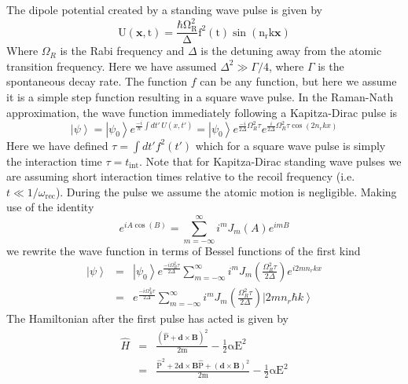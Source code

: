The dipole potential created by a standing wave pulse is given by
\begin{equation}
\mathrm{U(\mathbf{x},t)=\frac{\hbar \Omega_R^2}{\Delta}f^2(t)\sin{(n_rk\mathbf{x})}}
\end{equation}
Where $\Omega_R$ is the Rabi frequency and $\Delta$ is the detuning away from the atomic transition frequency.  Here we have assumed $\Delta^2 \gg \Gamma/4$, where $\Gamma$ is the spontaneous decay rate. The function $f$ can be any function, but here we assume it is a simple step function resulting in a square wave pulse.
In the Raman-Nath approximation, the wave function immediately following a Kapitza-Dirac pulse is \cite{meystre,ketterle}
\begin{equation}
\left|\psi\right>=\left|\psi_0\right>e^{\frac{-i}{\hbar}\int dt'\,U(x,t')}=\left|\psi_0\right>e^{\frac{-i}{2\Delta}\Omega_R^2\tau}e^{\frac{i}{2\Delta}\Omega_R^2\tau\cos{(2n_rkx)}}
\end{equation}
Here we have defined $\tau=\int dt' f^2(t')$ which for a square wave pulse is simply the interaction time $\tau=t_{\mathrm{int}}$.  Note that for Kapitza-Dirac standing wave pulses we are assuming short interaction times relative to the recoil frequency (i.e.\, $t\ll 1/\omega_{\mathrm{rec}}$).  During the pulse we assume the atomic motion is negligible.   Making use of the identity 
\begin{equation}
e^{iA\cos{(B)}}=\sum\limits_{m=-\infty}^{\infty}i^mJ_m(A)e^{imB}
\end{equation}
we rewrite the wave function in terms of Bessel functions of the first kind
\begin{eqnarray}
\left|\psi\right>&=&\left|\psi_0\right>e^{\frac{-i\Omega_R^2\tau}{2\Delta}}\sum\limits_{m=-\infty}^{\infty}i^mJ_m\left(\frac{\Omega_R^2\tau}{2\Delta}\right)e^{i2mn_rkx} \nonumber \\
&=&e^{\frac{-i\Omega_R^2\tau}{2\Delta}}\sum\limits_{m=-\infty}^{\infty}i^mJ_m\left(\frac{\Omega_R^2\tau}{2\Delta}\right)\left|2mn_r\hbar k\right>
\end{eqnarray}
The Hamiltonian after the first pulse has acted is given by
\begin{eqnarray}
\hat{H}&=&\mathrm{\frac{\left(\hat{P}+\mathbf{d}\times\mathbf{B}\right)^2}{2m}-\frac{1}{2}\alpha E^2}\nonumber \\
&=&\mathrm{\frac{\hat{P}^2+2\mathbf{d}\times\mathbf{B}\hat{P}+\left(\mathbf{d}\times\mathbf{B}\right)^2}{2m}-\frac{1}{2}\alpha E^2}\nonumber \\
\end{eqnarray}

